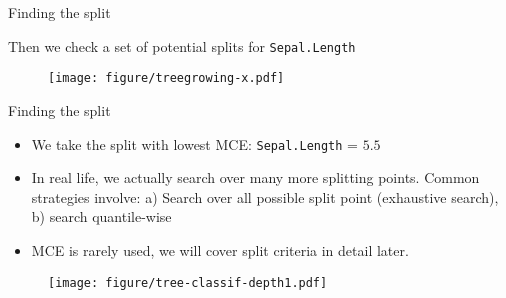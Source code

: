 \documentclass[11pt,compress,t,notes=noshow, xcolor=table]{beamer}
\begin{document}
\begin{vbframe}{Finding the split}

Then we check a set of potential splits for \texttt{Sepal.Length}

\begin{figure}
\texttt{[image: figure/treegrowing-x.pdf]}
\end{figure}

\end{vbframe}

\begin{vbframe}{Finding the split}

\begin{itemize}
\item We take the split with lowest MCE: \texttt{Sepal.Length} = $5.5$
\item In real life, we actually search over many more splitting points.
Common strategies involve: a) Search over all possible split point (exhaustive search), b) search quantile-wise 
\item MCE is rarely used, we will cover split criteria in detail later.
\end{itemize}


\begin{figure}
\texttt{[image: figure/tree-classif-depth1.pdf]}
\end{figure}

\end{vbframe}
\end{document}
